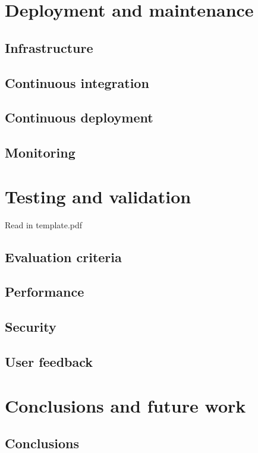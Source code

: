 \documentclass[12pt,a4paper]{report}
\begin{document}
\chapter{Deployment and maintenance}
\section{Infrastructure}

\section{Continuous integration}

\section{Continuous deployment}

\section{Monitoring}



\chapter{Testing and validation}
Read in template.pdf
\section{Evaluation criteria}

\section{Performance}

\section{Security}

\section{User feedback}



\chapter{Conclusions and future work}
\section{Conclusions}
\end{document}
